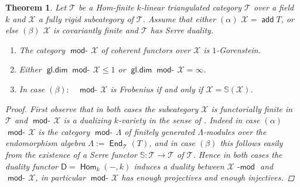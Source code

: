 \documentclass[oneside, a4paper,reqno]{amsart}
\numberwithin{equation}{section}
\newtheorem{thm}{Theorem}[section]
\theoremstyle{definition}
\begin{document}
  \begin{thm} Let ${\mathcal T}$ be a Hom-finite  $k$-linear triangulated category ${\mathcal T}$ over a field $k$ and ${\mathcal X}$ a  fully rigid subcategory of ${\mathcal T}$. Assume that either $(\alpha)$ ${\mathcal X} = \operatorname*{\mathsf{add}} T$, or else $(\beta)$ ${\mathcal X}$ is covariantly finite and ${\mathcal T}$ has Serre duality.  
\begin{enumerate}
\item  The category $\operatorname*{\mathsf{mod}-\!}{\mathcal X}$ of coherent functors over ${\mathcal X}$ is $1$-Gorenstein.
\item  Either $\operatorname*{\mathsf{gl.dim}}\operatorname*{\mathsf{mod}-\!}{\mathcal X} \leq 1$  or $\operatorname*{\mathsf{gl.dim}}\operatorname*{\mathsf{mod}-\!}{\mathcal X} = \infty$. 
\item In case $(\beta)\!:$ \, $\operatorname*{\mathsf{mod}-\!}{\mathcal X}$ is Frobenius if and only if ${\mathcal X} = \mathbb S({\mathcal X})$.
 \end{enumerate}
  \begin{proof} First observe that in both cases the subcategory ${\mathcal X}$ is functorially finite in ${\mathcal T}$ and $\operatorname*{\mathsf{mod}-\!}{\mathcal X}$ is a dualizing $k$-variety in the sense of \cite{AR}. Indeed in case $(\alpha)$ $\operatorname*{\mathsf{mod}-\!}{\mathcal X}$ is the category $\operatorname*{\mathsf{mod}-\!}\Lambda$ of finitely generated $\Lambda$-modules over the endomorphism algebra $\Lambda := \operatorname*{\mathsf{End}}_{\mathcal T}(T)$, and in case $(\beta)$ this follows easily from the existence of a Serre functor $\mathbb S \colon {\mathcal T} {\longrightarrow} {\mathcal T}$ of ${\mathcal T}$. Hence in both cases the duality functor $\mathsf{D} = \operatorname{\mathsf{Hom}}_{k}(-,k)$ induces a duality between ${\mathcal X}\operatorname*{\!-\mathsf{mod}}$ and $\operatorname*{\mathsf{mod}-\!}{\mathcal X}$, in particular $\operatorname*{\mathsf{mod}-\!}{\mathcal X}$ has enough projectives and enough injectives.  


\end{proof}
\end{thm}
\end{document}

